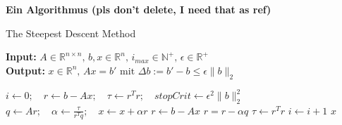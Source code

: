 \documentclass[a4paper,12pt]{llncs}
\newcommand{\N}{{\mathbb{N}}}
\newcommand{\R}{{\mathbb{R}}}
\newcommand\norm[1]{\lVert#1\rVert}
\numberwithin{equation}{section}
\begin{document}
{\flushleft\begin{definition} \textbf{Ein Algorithmus (pls don't delete, I need that as ref)}\\
\centering
\begin{minipage}{0.65\textwidth}
  \vspace{-\abovedisplayskip}
  \begin{algorithm}[H]
  \caption{The Steepest Descent Method}\label{alg:steep}
  \hspace*{\algorithmicindent} \textbf{Input:} $A\in\R^{n\times n}, \, b, x\in\R^{n}, \, i_{max}\in\N^{+}, \, \epsilon\in\R^{+}$\\
  \hspace*{\algorithmicindent} \textbf{Output:} $x\in\R^n, \, Ax = b' \text{ mit } \Delta b:=b'-b\leq\epsilon\norm{b}_{2}$
    \begin{algorithmic}[1]
    \State $i \gets 0; \quad r \gets b - Ax; \quad \tau \gets r^{T}r; \quad stopCrit \gets \epsilon^{2}\norm{b}_{2}^{2}$ 
    \State $q \gets Ar; \quad \alpha \gets \frac{\tau}{r^{T}q}; \quad x \gets x + \alpha r$
      \State $r \gets b-Ax$\label{alg:steep:r}
    \Else 
      \State $r = r - \alpha q$\label{alg:steep:r_Alternativ}
    \EndIf
    \State $\tau \gets r^{T}r$
    \State $i \gets i+1$
    \EndWhile
    \State \Return $x$
    \EndProcedure
    \end{algorithmic}
  \end{algorithm}
\end{minipage}
\end{definition}}
\vspace{\belowdisplayskip}
\end{document}
